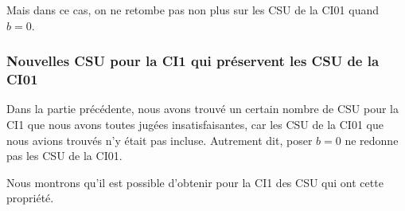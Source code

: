       Mais dans ce cas, on ne retombe pas non plus sur les CSU de la CI01 quand \(b=0\).




        

    \subsubsection{Nouvelles CSU pour la CI1 qui préservent les CSU de la CI01}
      Dans la partie précédente, nous avons trouvé un certain nombre de CSU pour la CI1 que nous avons toutes jugées insatisfaisantes, car les CSU de la CI01 que nous avions trouvés n'y était pas incluse. Autrement dit, poser \(b=0\) ne redonne pas les CSU de la CI01.

      Nous montrons qu'il est possible d'obtenir pour la CI1 des CSU qui ont cette propriété.

